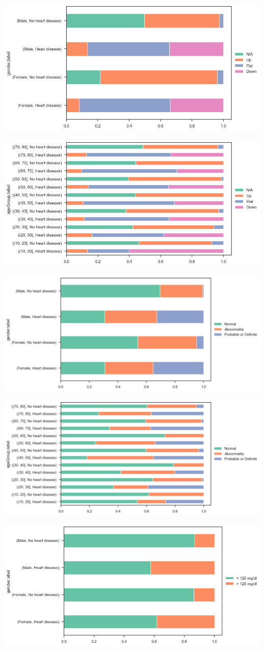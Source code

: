 \includegraphics[width=0.8\linewidth]{media/frequency-03-gender-slope.png}

\includegraphics[width=0.8\linewidth]{media/frequency-04-agegroup-slope.png}

\includegraphics[width=0.8\linewidth]{media/frequency-05-gender-ecg.png}

\includegraphics[width=0.8\linewidth]{media/frequency-06-agegroup-ecg.png}

\includegraphics[width=0.8\linewidth]{media/frequency-07-gender-bloodsugar.png}

